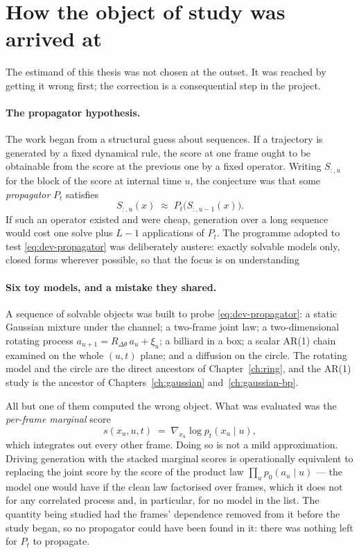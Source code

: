 \section{How the object of study was arrived at}\label{sec:dev-history}

The estimand of this thesis was not chosen at the outset. It was reached by
getting it wrong first; the correction is a consequential step in the project.

\paragraph{The propagator hypothesis.} The work began from a structural guess
about sequences. If a trajectory is generated by a fixed dynamical rule, the score at one frame
ought to be obtainable from the score at the previous one by a fixed operator.
Writing $S_{:,u}$ for the block of the score at internal time $u$, the
conjecture was that some \emph{propagator} $P_t$ satisfies
\begin{equation}
  S_{:,u}(x) \;\approx\; P_t\big(S_{:,u-1}(x)\big).
  \label{eq:dev-propagator}
\end{equation}
If such an operator existed and were cheap, generation over a long sequence
would cost one solve plus $L-1$ applications of $P_t$. The programme adopted to
test \eqref{eq:dev-propagator} was deliberately austere: exactly solvable
models only, closed forms wherever possible, so that the focus is on understanding

\paragraph{Six toy models, and a mistake they shared.} A sequence of solvable
objects was built to probe \eqref{eq:dev-propagator}: a static Gaussian
mixture under the channel; a two-frame joint law; a two-dimensional rotating
process $a_{u+1} = R_{\Delta\theta}\, a_u + \xi_u$; a billiard in a box; a
scalar AR(1) chain examined on the whole $(u,t)$ plane; and a diffusion on the
circle. The rotating model and the circle are the direct ancestors of
Chapter~\ref{ch:ring}, and the AR(1) study is the ancestor of
Chapters~\ref{ch:gaussian} and~\ref{ch:gaussian-bp}.

All but one of them computed the wrong object. What was evaluated was the
\emph{per-frame marginal} score
\begin{equation}
  s(x_u, u, t) \;=\; \nabla_{x_u} \log p_t(x_u \mid u),
  \label{eq:dev-marginal-score}
\end{equation}
which integrates out every other frame. Doing so is not a mild approximation.
Driving generation with the stacked marginal scores is operationally equivalent
to replacing the joint score by the score of the product law
$\prod_u p_0(a_u \mid u)$ --- the model one would have if the clean law
factorised over frames, which it does not for any correlated process and, in
particular, for no model in the list.
The quantity being studied had the frames' dependence removed from it before
the study began, so no propagator could have been found in it: there was
nothing left for $P_t$ to propagate.


